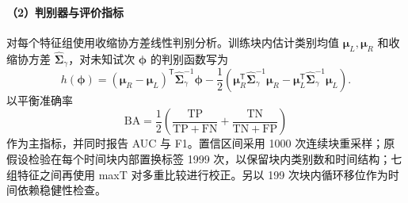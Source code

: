 \documentclass[a4paper]{ctexart}
\numberwithin{figure}{section}       %
\begin{document}
\begin{table}[H]
\centering
\caption{视觉刺激响应特征构成表}
\label{tab:q2_feature_def}
\end{table}

\paragraph{（2）判别器与评价指标}

对每个特征组使用收缩协方差线性判别分析。训练块内估计类别均值 $\boldsymbol\mu_L,\boldsymbol\mu_R$ 和收缩协方差 $\widehat{\boldsymbol\Sigma}_\gamma$，对未知试次 $\boldsymbol\phi$ 的判别函数写为
\begin{equation}
h(\boldsymbol\phi)
=
\left(\boldsymbol\mu_R-\boldsymbol\mu_L\right)^{\mathsf T}
\widehat{\boldsymbol\Sigma}_{\gamma}^{-1}\boldsymbol\phi
-\frac12
\left(
\boldsymbol\mu_R^{\mathsf T}
\widehat{\boldsymbol\Sigma}_{\gamma}^{-1}\boldsymbol\mu_R
-
\boldsymbol\mu_L^{\mathsf T}
\widehat{\boldsymbol\Sigma}_{\gamma}^{-1}\boldsymbol\mu_L
\right).
\label{eq:q2_lda}
\end{equation}
以平衡准确率
\begin{equation}
\mathrm{BA}
=\frac12
\left(
\frac{\mathrm{TP}}{\mathrm{TP}+\mathrm{FN}}
+
\frac{\mathrm{TN}}{\mathrm{TN}+\mathrm{FP}}
\right)
\label{eq:q2_ba}
\end{equation}
作为主指标，并同时报告 AUC 与 F1。置信区间采用 1000 次连续块重采样；原假设检验在每个时间块内部置换标签 1999 次，以保留块内类别数和时间结构；七组特征之间再使用 maxT 对多重比较进行校正。另以 199 次块内循环移位作为时间依赖稳健性检查。
\end{document}
